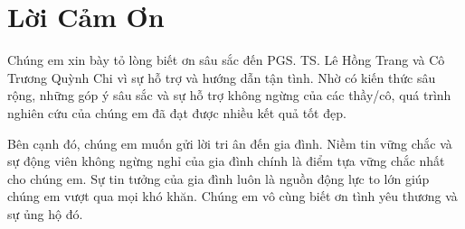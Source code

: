 \section*{\Huge Lời Cảm Ơn}
Chúng em xin bày tỏ lòng biết ơn sâu sắc đến PGS. TS. Lê Hồng Trang và Cô Trương Quỳnh Chi vì sự hỗ trợ và hướng dẫn tận tình. Nhờ có kiến thức sâu rộng, những góp ý sâu sắc và sự hỗ trợ không ngừng của các thầy/cô, quá trình nghiên cứu của chúng em đã đạt được nhiều kết quả tốt đẹp.

Bên cạnh đó, chúng em muốn gửi lời tri ân đến gia đình. Niềm tin vững chắc và sự động viên không ngừng nghỉ của gia đình chính là điểm tựa vững chắc nhất cho chúng em. Sự tin tưởng của gia đình luôn là nguồn động lực to lớn giúp chúng em vượt qua mọi khó khăn. Chúng em vô cùng biết ơn tình yêu thương và sự ủng hộ đó.